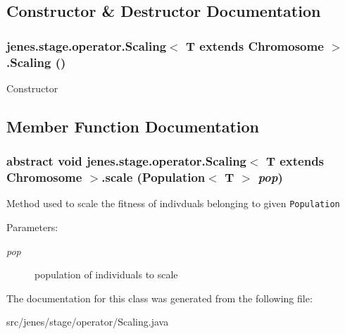\subsection{Constructor \& Destructor Documentation}
\hypertarget{classjenes_1_1stage_1_1operator_1_1_scaling_3_01_t_01extends_01_chromosome_01_4_04089dfb0f712c85ca27fdbab69a5b9e}{
\subsubsection[Scaling]{\setlength{\rightskip}{0pt plus 5cm}jenes.stage.operator.Scaling$<$ T extends Chromosome $>$.Scaling ()}}
\label{classjenes_1_1stage_1_1operator_1_1_scaling_3_01_t_01extends_01_chromosome_01_4_04089dfb0f712c85ca27fdbab69a5b9e}


Constructor 

\subsection{Member Function Documentation}
\hypertarget{classjenes_1_1stage_1_1operator_1_1_scaling_3_01_t_01extends_01_chromosome_01_4_e72d4b2ab8bd3504471ce67788c841cd}{
\subsubsection[scale]{\setlength{\rightskip}{0pt plus 5cm}abstract void jenes.stage.operator.Scaling$<$ T extends Chromosome $>$.scale (Population$<$ T $>$ {\em pop})}}
\label{classjenes_1_1stage_1_1operator_1_1_scaling_3_01_t_01extends_01_chromosome_01_4_e72d4b2ab8bd3504471ce67788c841cd}


Method used to scale the fitness of indivduals belonging to given {\tt Population} 

\begin{Desc}
\item[Parameters:]
\begin{description}
\item[{\em pop}]population of individuals to scale \end{description}
\end{Desc}


The documentation for this class was generated from the following file:\begin{CompactItemize}
\item 
src/jenes/stage/operator/Scaling.java\end{CompactItemize}
